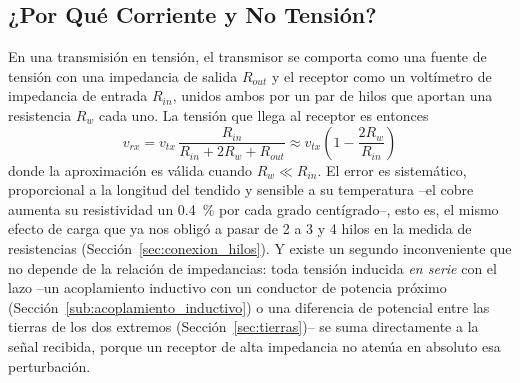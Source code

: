 \subsection{¿Por Qué Corriente y No Tensión?}\label{sub:por_que_corriente}

En una transmisión en tensión, el transmisor se comporta como una fuente de tensión con una impedancia de salida $R_{out}$ y el receptor como un voltímetro de impedancia de entrada $R_{in}$, unidos ambos por un par de hilos que aportan una resistencia $R_w$ cada uno. La tensión que llega al receptor es entonces
\begin{equation}\label{eq:error_cable_tension}
    v_{rx} = v_{tx}\,\frac{R_{in}}{R_{in} + 2R_w + R_{out}} \approx v_{tx}\left(1 - \frac{2R_w}{R_{in}}\right)
\end{equation}
donde la aproximación es válida cuando $R_w \ll R_{in}$. El error es sistemático, proporcional a la longitud del tendido y sensible a su temperatura --el cobre aumenta su resistividad un \SI{0.4}{\percent} por cada grado centígrado--, esto es, el mismo efecto de carga que ya nos obligó a pasar de 2 a 3 y 4 hilos en la medida de resistencias (Sección~\ref{sec:conexion_hilos}). Y existe un segundo inconveniente que no depende de la relación de impedancias: toda tensión inducida \emph{en serie} con el lazo --un acoplamiento inductivo con un conductor de potencia próximo (Sección~\ref{sub:acoplamiento_inductivo}) o una diferencia de potencial entre las tierras de los dos extremos (Sección~\ref{sec:tierras})-- se suma directamente a la señal recibida, porque un receptor de alta impedancia no atenúa en absoluto esa perturbación.

